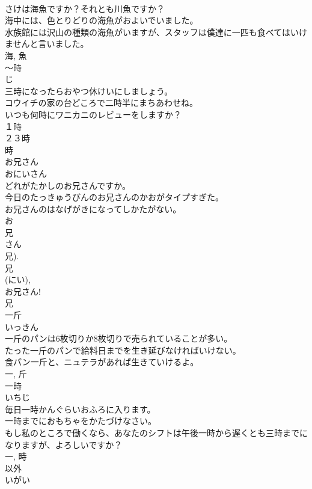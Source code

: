 \documentclass[8pt]{extreport}
\begin{document}
\begin{CJK}{UTF8}{min}
\\	さけは海魚ですか？それとも川魚ですか？	
\\	海中には、色とりどりの海魚がおよいでいました。	
\\	水族館には沢山の種類の海魚がいますが、スタッフは僕達に一匹も食べてはいけませんと言いました。	
\\	海, 魚	
\\	〜時	
\\	じ	
\\	三時になったらおやつ休けいにしましょう。	
\\	コウイチの家の台どころで二時半にまちあわせね。	
\\	いつも何時にワニカニのレビューをしますか？	
\\	１時 
\\	２３時 
\\	時	
\\	お兄さん	
\\	おにいさん	
\\	どれがたかしのお兄さんですか。	
\\	今日のたっきゅうびんのお兄さんのかおがタイプすぎた。	
\\	お兄さんのはなげがきになってしかたがない。	
\\	お 
\\	兄 
\\	さん 
\\	兄).
\\	兄 
\\	(にい), 
\\	お兄さん!
\\	兄	
\\	一斤	
\\	いっきん	
\\	一斤のパンは6枚切りか8枚切りで売られていることが多い。	
\\	たった一斤のパンで給料日までを生き延びなければいけない。	
\\	食パン一斤と、ニュテラがあれば生きていけるよ。	
\\	一, 斤	
\\	一時	
\\	いちじ	
\\	毎日一時かんぐらいおふろに入ります。	
\\	一時までにおもちゃをかたづけなさい。	
\\	もし私のところで働くなら、あなたのシフトは午後一時から遅くとも三時までになりますが、よろしいですか？	
\\	一, 時	
\\	以外	
\\	いがい	

\end{CJK}
\end{document}
